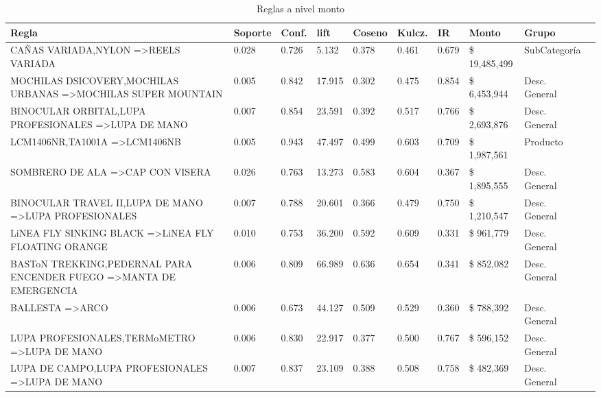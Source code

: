 \documentclass[]{article}
\begin{document}
	\begin{landscape}
		\begin{table}[htbp]
			\centering
			\caption{Reglas a nivel monto}
			\addtolength{\tabcolsep}{-3.5pt}
			\renewcommand{\arraystretch}{1.2} 
			\begin{tabular}{llllllllll}
				\textbf{Regla} & \textbf{Soporte} & \textbf{Conf.} & \textbf{lift} & \textbf{Coseno} & \textbf{Kulcz.} & \textbf{IR} & \textbf{Monto} & \textbf{Grupo} \\	
				\hline					
				{CAÑAS VARIADA,NYLON} =\textgreater {REELS VARIADA} & 0.028 & 0.726 & 5.132 & 0.378 & 0.461 & 0.679 &  \$ 19,485,499  & SubCategoría \\
				{MOCHILAS DSICOVERY,MOCHILAS URBANAS} =\textgreater {MOCHILAS SUPER MOUNTAIN} & 0.005 & 0.842 & 17.915 & 0.302 & 0.475 & 0.854 &  \$    6,453,944  & Desc. General \\
				{BINOCULAR ORBITAL,LUPA PROFESIONALES} =\textgreater {LUPA DE MANO} & 0.007 & 0.854 & 23.591 & 0.392 & 0.517 & 0.766 &  \$    2,693,876  & Desc. General \\
				{LCM1406NR,TA1001A} =\textgreater {LCM1406NB} & 0.005 & 0.943 & 47.497 & 0.499 & 0.603 & 0.709 &  \$    1,987,561  & Producto \\
				{SOMBRERO DE ALA} =\textgreater {CAP CON VISERA} & 0.026 & 0.763 & 13.273 & 0.583 & 0.604 & 0.367 &  \$    1,895,555  & Desc. General \\
				{BINOCULAR TRAVEL II,LUPA DE MANO} =\textgreater {LUPA PROFESIONALES} & 0.007 & 0.788 & 20.601 & 0.366 & 0.479 & 0.750 &  \$    1,210,547  & Desc. General \\
				{LiNEA FLY SINKING BLACK} =\textgreater {LiNEA FLY FLOATING ORANGE} & 0.010 & 0.753 & 36.200 & 0.592 & 0.609 & 0.331 &  \$       961,779  & Desc. General \\
				{BASToN TREKKING,PEDERNAL PARA ENCENDER FUEGO} =\textgreater {MANTA DE EMERGENCIA} & 0.006 & 0.809 & 66.989 & 0.636 & 0.654 & 0.341 &  \$       852,082  & Desc. General \\
				{BALLESTA} =\textgreater {ARCO} & 0.006 & 0.673 & 44.127 & 0.509 & 0.529 & 0.360 &  \$       788,392  & Desc. General \\
				{LUPA PROFESIONALES,TERMoMETRO} =\textgreater {LUPA DE MANO} & 0.006 & 0.830 & 22.917 & 0.377 & 0.500 & 0.767 &  \$       596,152  & Desc. General \\
				{LUPA DE CAMPO,LUPA PROFESIONALES} =\textgreater {LUPA DE MANO} & 0.007 & 0.837 & 23.109 & 0.388 & 0.508 & 0.758 &  \$       482,369  & Desc. General \\

\end{tabular}
\end{table}
\end{landscape}
\end{document}
